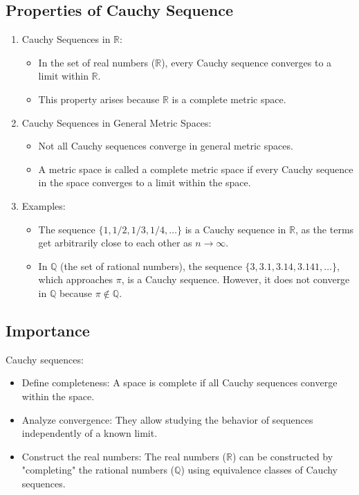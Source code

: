 \subsection{Properties of Cauchy Sequence}
\begin{enumerate}
    \item Cauchy Sequences in \( \mathbb{R} \):
    \begin{itemize}
        \item In the set of real numbers (\( \mathbb{R} \)), every Cauchy sequence converges to a limit within \( \mathbb{R} \).
        \item This property arises because \( \mathbb{R} \) is a complete metric space.
    \end{itemize}

    \item Cauchy Sequences in General Metric Spaces:
    \begin{itemize}
        \item Not all Cauchy sequences converge in general metric spaces.
        \item A metric space is called a complete metric space if every Cauchy sequence in the space converges to a limit within the space.
    \end{itemize}

    \item Examples:
    \begin{itemize}
        \item The sequence \( \{1, 1/2, 1/3, 1/4, \dots\} \) is a Cauchy sequence in \( \mathbb{R} \), as the terms get arbitrarily close to each other as \( n \to \infty \).
        \item In \( \mathbb{Q} \) (the set of rational numbers), the sequence \( \{3, 3.1, 3.14, 3.141, \dots\} \), which approaches \( \pi \), is a Cauchy sequence. However, it does not converge in \( \mathbb{Q} \) because \( \pi \notin \mathbb{Q} \).
    \end{itemize}
\end{enumerate}

\subsection{Importance}
Cauchy sequences:
\begin{itemize}
    \item Define completeness: A space is complete if all Cauchy sequences converge within the space.
    \item Analyze convergence: They allow studying the behavior of sequences independently of a known limit.
    \item Construct the real numbers: The real numbers (\( \mathbb{R} \)) can be constructed by "completing" the rational numbers (\( \mathbb{Q} \)) using equivalence classes of Cauchy sequences.
\end{itemize}

